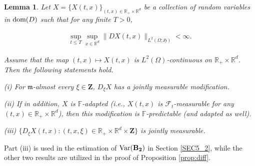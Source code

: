 \documentclass[letterpaper, 11pt,  reqno]{amsart}
\newtheorem{lemma}[theorem]{Lemma}
\newcommand{\noi}{\noindent}
\newcommand{\R}{\mathbb{R}}
\newcommand{\bR}{\mathbb{R}}
\newcommand{\F}{\mathcal{F}}
\renewcommand{\O}{\Omega}
\newcommand{\Var}{\textup{Var}}
\newcommand{\fm}{\mathfrak{m}}
\newcommand{\fH}{\mathfrak{H}}
\newcommand{\dom}{\textup{dom}}
\numberwithin{equation}{section}
\numberwithin{theorem}{section}
\begin{document}
\begin{lemma}
\label{lem_pred}
Let $X= \{ X(t,x)\}_{(t,x)\in\R_+\times\R^d}$ 
be a collection of   random variables in $\dom(D)$ 
such that for any finite $T >0$,

\noi
\begin{align} \label{sup_DX}
\sup_{t\leq T}\sup_{x\in\R^d}  \| DX(t,x) \|_{L^2(\O; \fH)} < \infty.
\end{align}

\noi
Assume that  the map $(t,x) \mapsto X(t,x)$ is $L^2(\O)$-continuous 
on $\bR_{+}\times\R^d$. Then the following statements hold.

\smallskip
\noi
{\rm (i)} For $\fm$-almost every $\xi\in\mathbf{Z}$,
  $D_\xi X$ has a jointly measurable modification.
  
  \smallskip
\noi
{\rm (ii)}
   If in addition, $X$ is $\mathbb{F}$-adapted {\rm(}i.e., $X(t,x)$ is $\F_t$-measurable 
   for any $(t,x)\in\R_+\times \R^d${\rm)}, 
   then this modification is $\mathbb{F}$-predictable {\rm(}and adapted as well{\rm)}.
   

  \smallskip
\noi
{\rm (iii)}    $\{D_\xi X(t,x): (t, x, \xi)\in   \R_+\times\R^d \times \mathbf{Z} \}$
is jointly measurable. 

 

\end{lemma}

Part (iii) is used in the estimation of $\Var(\mathbf{B_2})$ in Section \ref{SEC5_2},
while the other two results are utilized in the proof of Proposition \ref{prop:diff}.
\end{document}

